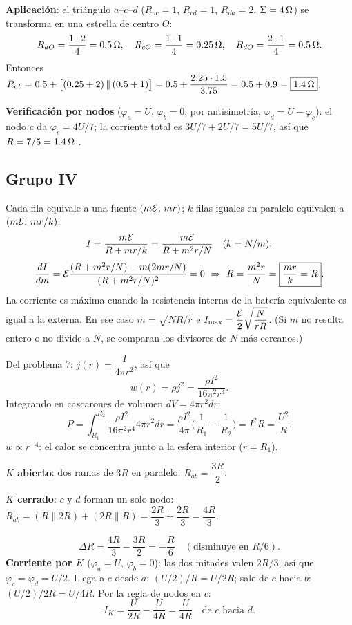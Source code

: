 \textbf{Aplicación}: el triángulo $a$--$c$--$d$ ($R_{ac}=1$, $R_{cd}=1$, $R_{da}=2$, $\Sigma=4\ohm$) se transforma en una estrella de centro $O$:
\[
R_{aO}=\frac{1\cdot2}{4}=0.5\ohm,\quad R_{cO}=\frac{1\cdot1}{4}=0.25\ohm,\quad R_{dO}=\frac{2\cdot1}{4}=0.5\ohm.
\]
Entonces $R_{ab}=0.5+\big[(0.25+2)\,\|\,(0.5+1)\big]=0.5+\dfrac{2.25\cdot1.5}{3.75}=0.5+0.9=\boxed{1.4\ohm}$.

\textbf{Verificación por nodos} ($\varphi_a=U$, $\varphi_b=0$; por antisimetría, $\varphi_d=U-\varphi_c$): el nodo $c$ da $\varphi_c=4U/7$; la corriente total es $3U/7+2U/7=5U/7$, así que $R=7/5=1.4\ohm$ \checkmark.

\subsection*{Grupo IV}
Cada fila equivale a una fuente $(m\fem,\,mr)$; $k$ filas iguales en paralelo equivalen a $(m\fem,\,mr/k)$:
\[
I=\frac{m\fem}{R+mr/k}=\frac{m\fem}{R+m^2r/N}\quad(k=N/m).
\]
\[
\frac{dI}{dm}=\fem\frac{(R+m^2r/N)-m(2mr/N)}{(R+m^2r/N)^2}=0\ \Rightarrow\ R=\frac{m^2r}{N}=\boxed{\frac{mr}{k}=R}.
\]
La corriente es máxima cuando la resistencia interna de la batería equivalente es igual a la externa. En ese caso $m=\sqrt{NR/r}$ e $I_{\max}=\dfrac{\fem}{2}\sqrt{\dfrac{N}{rR}}$. (Si $m$ no resulta entero o no divide a $N$, se comparan los divisores de $N$ más cercanos.)

Del problema 7: $j(r)=\dfrac{I}{4\pi r^2}$, así que
\[
w(r)=\rho j^2=\frac{\rho I^2}{16\pi^2r^4}.
\]
Integrando en cascarones de volumen $dV=4\pi r^2dr$:
\[
P=\int_{R_1}^{R_2}\frac{\rho I^2}{16\pi^2r^4}4\pi r^2dr=\frac{\rho I^2}{4\pi}\Big(\frac1{R_1}-\frac1{R_2}\Big)=I^2R=\boxed{\frac{U^2}{R}}.
\]
$w\propto r^{-4}$: el calor se concentra junto a la esfera interior ($r=R_1$).

\begin{center}\circInterruptor\end{center}
\textbf{$K$ abierto}: dos ramas de $3R$ en paralelo: $R_{ab}=\dfrac{3R}{2}$.

\textbf{$K$ cerrado}: $c$ y $d$ forman un solo nodo: $R_{ab}=(R\|2R)+(2R\|R)=\dfrac{2R}{3}+\dfrac{2R}{3}=\dfrac{4R}{3}$.

\[
\Delta R=\frac{4R}{3}-\frac{3R}{2}=\boxed{-\frac R6}\quad(\text{disminuye en }R/6).
\]
\textbf{Corriente por $K$} ($\varphi_a=U$, $\varphi_b=0$): las dos mitades valen $2R/3$, así que $\varphi_c=\varphi_d=U/2$. Llega a $c$ desde $a$: $(U/2)/R=U/2R$; sale de $c$ hacia $b$: $(U/2)/2R=U/4R$. Por la regla de nodos en $c$:
\[
I_K=\frac{U}{2R}-\frac{U}{4R}=\boxed{\frac{U}{4R}}\quad\text{de }c\text{ hacia }d.
\]

